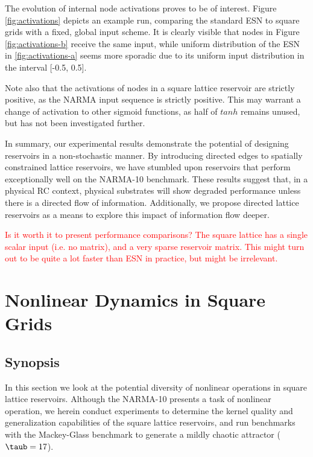The evolution of internal node activations proves to be of interest. Figure
\ref{fig:activations} depicts an example run, comparing the standard ESN to
square grids with a fixed, global input scheme. It is clearly visible that nodes
in Figure \ref{fig:activations-b} receive the same input, while uniform
distribution of the ESN in \ref{fig:activations-a} seems more sporadic due to
its uniform input distribution in the interval [-0.5, 0.5].

Note also that the activations of nodes in a square lattice reservoir are
strictly positive, as the NARMA input sequence is strictly positive. This may
warrant a change of activation to other sigmoid functions, as half of $tanh$
remains unused, but has not been investigated further.

In summary, our experimental results demonstrate the potential of designing
reservoirs in a non-stochastic manner. By introducing directed edges to
spatially constrained lattice reservoirs, we have stumbled upon reservoirs that
perform exceptionally well on the NARMA-10 benchmark. These results suggest
that, in a physical RC context, physical substrates will show degraded
performance unless there is a directed flow of information. Additionally, we
propose directed lattice reservoirs as a means to explore this impact of
information flow deeper.

\textcolor{red}{
  Is it worth it to present performance comparisons? The square lattice has a
single scalar input (i.e. no matrix), and a very sparse reservoir matrix. This
might turn out to be quite a lot faster than ESN in practice, but might be
irrelevant.
}

\section{Nonlinear Dynamics in Square Grids}

\subsection{Synopsis}

In this section we look at the potential diversity of nonlinear operations in
square lattice reservoirs. Although the NARMA-10 presents a task of nonlinear
operation, we herein conduct experiments to determine the kernel quality and
generalization capabilities of the square lattice reservoirs, and run benchmarks
with the Mackey-Glass benchmark to generate a mildly chaotic attractor ($\taub =
17$).

